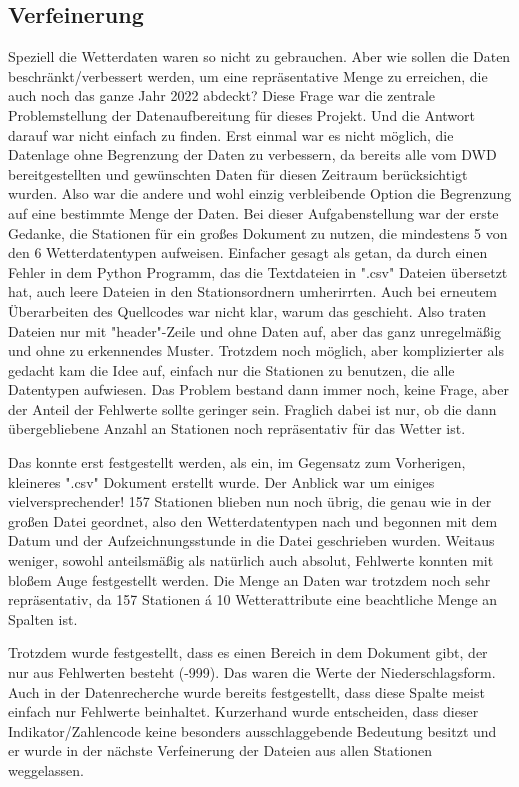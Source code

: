 \documentclass[letterpaper]{article} %
\begin{document}
    \subsection*{Verfeinerung}
        Speziell die Wetterdaten waren so nicht zu gebrauchen. Aber wie sollen die Daten beschränkt/verbessert werden, um eine repräsentative Menge zu erreichen, die auch noch das ganze Jahr 2022 abdeckt? Diese Frage war die zentrale Problemstellung der Datenaufbereitung für dieses Projekt. Und die Antwort darauf war nicht einfach zu finden. Erst einmal war es nicht möglich, die Datenlage ohne Begrenzung der Daten zu verbessern, da bereits alle vom DWD bereitgestellten und gewünschten Daten für diesen Zeitraum berücksichtigt wurden.
        Also war die andere und wohl einzig verbleibende Option die Begrenzung auf eine bestimmte Menge der Daten. Bei dieser Aufgabenstellung war der erste Gedanke, die Stationen für ein großes Dokument zu nutzen, die mindestens 5 von den 6 Wetterdatentypen aufweisen. Einfacher gesagt als getan, da durch einen Fehler in dem Python Programm, das die Textdateien in ".csv" Dateien übersetzt hat, auch leere Dateien in den Stationsordnern umherirrten. Auch bei erneutem Überarbeiten des Quellcodes war nicht klar, warum das geschieht. Also traten Dateien nur mit "header"-Zeile und ohne Daten auf, aber das ganz unregelmäßig und ohne zu erkennendes Muster. Trotzdem noch möglich, aber komplizierter als gedacht kam die Idee auf, einfach nur die Stationen zu benutzen, die alle Datentypen aufwiesen. Das Problem bestand dann immer noch, keine Frage, aber der Anteil der Fehlwerte sollte geringer sein. Fraglich dabei ist nur, ob die dann übergebliebene Anzahl an Stationen noch repräsentativ für das Wetter ist.

        Das konnte erst festgestellt werden, als ein, im Gegensatz zum Vorherigen, kleineres ".csv" Dokument erstellt wurde. Der Anblick war um einiges vielversprechender! 157 Stationen blieben nun noch übrig, die genau wie in der großen Datei geordnet, also den Wetterdatentypen nach und begonnen mit dem Datum und der Aufzeichnungsstunde in die Datei geschrieben wurden. Weitaus weniger, sowohl anteilsmäßig als natürlich auch absolut, Fehlwerte konnten mit bloßem Auge festgestellt werden. Die Menge an Daten war trotzdem noch sehr repräsentativ, da 157 Stationen á 10 Wetterattribute eine beachtliche Menge an Spalten ist.

        Trotzdem wurde festgestellt, dass es einen Bereich in dem Dokument gibt, der nur aus Fehlwerten besteht (-999). Das waren die Werte der Niederschlagsform. Auch in der Datenrecherche wurde bereits festgestellt, dass diese Spalte meist einfach nur Fehlwerte beinhaltet. Kurzerhand wurde entscheiden, dass dieser Indikator/Zahlencode keine besonders ausschlaggebende Bedeutung besitzt und er wurde in der nächste Verfeinerung der Dateien aus allen Stationen weggelassen.
\end{document}
